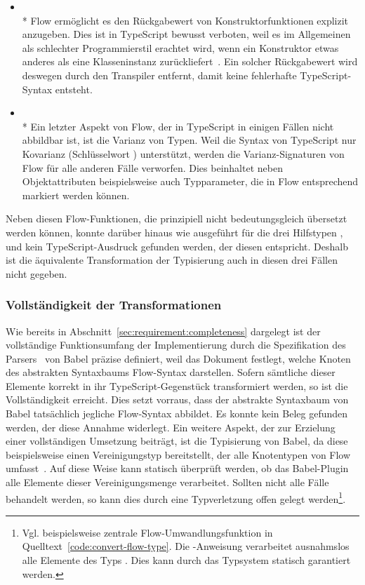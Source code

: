 \begin{itemize}
  \medbreak
  \item {}\\*
    Flow ermöglicht es den Rückgabewert von Konstruktorfunktionen explizit anzugeben. Dies ist in TypeScript bewusst verboten, weil es im Allgemeinen als schlechter Programmierstil erachtet wird, wenn ein Konstruktor etwas anderes als eine Klasseninstanz zurückliefert~\autocite{TS:GITHUB:CONSTRUCTOR_RETURN_TYPE}. Ein solcher Rückgabewert wird deswegen durch den Transpiler entfernt, damit keine fehlerhafte TypeScript-Syntax entsteht.
  \medbreak
  \item {}\\*
    Ein letzter Aspekt von Flow, der in TypeScript in einigen Fällen nicht abbildbar ist, ist die Varianz von Typen. Weil die Syntax von TypeScript nur Kovarianz (Schlüsselwort ) unterstützt, werden die Varianz-Signaturen von Flow für alle anderen Fälle verworfen. Dies beinhaltet neben Objektattributen beispielsweise auch Typparameter, die in Flow entsprechend markiert werden können.
\end{itemize}

Neben diesen Flow-Funktionen, die prinzipiell nicht bedeutungsgleich übersetzt werden können, konnte darüber hinaus wie ausgeführt für die drei Hilfstypen ,  und  kein TypeScript-Ausdruck gefunden werden, der diesen entspricht. Deshalb ist die äquivalente Transformation der Typisierung auch in diesen drei Fällen nicht gegeben.

\subsubsection{Vollständigkeit der Transformationen}

Wie bereits in Abschnitt~\ref{sec:requirement:completeness} dargelegt ist der vollständige Funktionsumfang der Implementierung durch die Spezifikation des Parsers~\autocite{BABEL:PARSER_SPEC} von Babel präzise definiert, weil das Dokument festlegt, welche Knoten des abstrakten Syntaxbaums Flow-Syntax darstellen. Sofern sämtliche dieser Elemente korrekt in ihr TypeScript-Gegenstück transformiert werden, so ist die Vollständigkeit erreicht. Dies setzt vorraus, dass der abstrakte Syntaxbaum von Babel tatsächlich jegliche Flow-Syntax abbildet. Es konnte kein Beleg gefunden werden, der diese Annahme widerlegt.
Ein weitere Aspekt, der zur Erzielung einer vollständigen Umsetzung beiträgt, ist die Typisierung von Babel, da diese beispielsweise einen Vereinigungstyp  bereitstellt, der alle Knotentypen von Flow umfasst~\autocite{BABEL:TYPES}. Auf diese Weise kann statisch überprüft werden, ob das Babel-Plugin alle Elemente dieser Vereinigungsmenge verarbeitet. Sollten nicht alle Fälle behandelt werden, so kann dies durch eine Typverletzung offen gelegt werden\footnote{Vgl. beispielsweise zentrale Flow-Umwandlungsfunktion in Quelltext~\ref{code:convert-flow-type}. Die -Anweisung verarbeitet ausnahmslos alle Elemente des Typs . Dies kann durch das Typsystem statisch garantiert werden.}.

